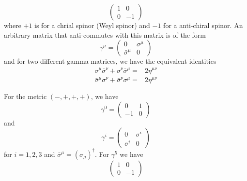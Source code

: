 \begin{rmk}
\[\begin{pmatrix}
1&0\\0&-1
\end{pmatrix}
\]
where $+1$ is for a chrial spinor (Weyl spinor) and $-1$ for a anti-chiral spinor. An arbitrary matrix that anti-commutes with this matrix is of the form
\[\gamma ^{\mu }=\begin{pmatrix}
0&\sigma ^{\mu }\\
\bar{\sigma }^{\mu }&0
\end{pmatrix}
\]
and for two different gamma matrices, we have the equivalent identities
\begin{align*}
\sigma ^{\mu }\bar{\sigma }^{\nu }+\sigma ^{\nu }\bar{\sigma }^{\mu }=&2\eta ^{\mu \nu }\\
\bar{\sigma }^{\mu }\sigma ^{\nu }+\bar{\sigma }^{\nu }\sigma ^{\mu }=&2\eta^{\mu \nu } 
\end{align*}
\end{rmk}
\vspace{2ex}
\begin{ex}
For the metric $(-,+,+,+)$, we have
\[\gamma ^{0}=\begin{pmatrix}
0&1\\-1&0
\end{pmatrix}
\]
and
\[\gamma ^{i}=\begin{pmatrix}
0&\sigma ^{i}\\\bar{\sigma }^{i}&0
\end{pmatrix}
\]
for $i=1,2,3$ and $\bar{\sigma }^{\mu }=(\sigma _{\mu })^{\dagger}$. For $\gamma ^{5}$ we have
\[\begin{pmatrix}
1&0\\0&-1
\end{pmatrix}
\]
\end{ex}
\vspace{2ex}
